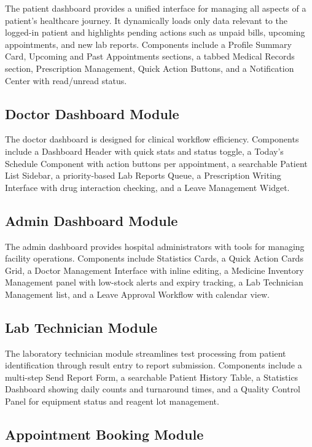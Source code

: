 \justifying
The patient dashboard provides a unified interface for managing all aspects of a patient's
healthcare journey. It dynamically loads only data relevant to the logged-in patient and
highlights pending actions such as unpaid bills, upcoming appointments, and new lab reports.
Components include a Profile Summary Card, Upcoming and Past Appointments sections,
a tabbed Medical Records section, Prescription Management, Quick Action Buttons, and a
Notification Center with read/unread status.

\subsection{Doctor Dashboard Module}

\justifying
The doctor dashboard is designed for clinical workflow efficiency. Components include a
Dashboard Header with quick stats and status toggle, a Today's Schedule Component with
action buttons per appointment, a searchable Patient List Sidebar, a priority-based Lab
Reports Queue, a Prescription Writing Interface with drug interaction checking, and a
Leave Management Widget.

\subsection{Admin Dashboard Module}

\justifying
The admin dashboard provides hospital administrators with tools for managing facility
operations. Components include Statistics Cards, a Quick Action Cards Grid, a Doctor
Management Interface with inline editing, a Medicine Inventory Management panel with
low-stock alerts and expiry tracking, a Lab Technician Management list, and a Leave
Approval Workflow with calendar view.

\subsection{Lab Technician Module}

\justifying
The laboratory technician module streamlines test processing from patient identification
through result entry to report submission. Components include a multi-step Send Report Form,
a searchable Patient History Table, a Statistics Dashboard showing daily counts and turnaround
times, and a Quality Control Panel for equipment status and reagent lot management.

\subsection{Appointment Booking Module}

